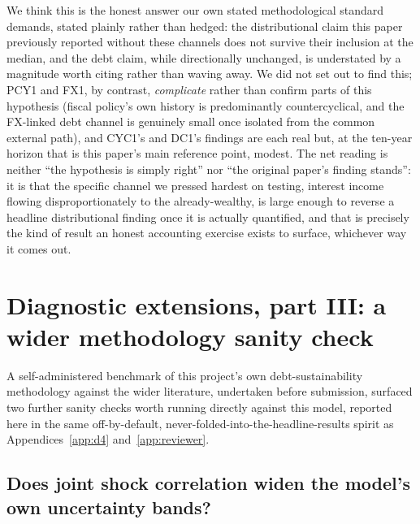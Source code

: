 \documentclass[11pt,a4paper]{article}
\begin{document}
We think this is the honest answer our own stated methodological standard demands, stated plainly rather than hedged: the distributional claim this paper previously reported without these channels does not survive their inclusion at the median, and the debt claim, while directionally unchanged, is understated by a magnitude worth citing rather than waving away. We did not set out to find this; PCY1 and FX1, by contrast, \emph{complicate} rather than confirm parts of this hypothesis (fiscal policy's own history is predominantly countercyclical, and the FX-linked debt channel is genuinely small once isolated from the common external path), and CYC1's and DC1's findings are each real but, at the ten-year horizon that is this paper's main reference point, modest. The net reading is neither ``the hypothesis is simply right'' nor ``the original paper's finding stands'': it is that the specific channel we pressed hardest on testing, interest income flowing disproportionately to the already-wealthy, is large enough to reverse a headline distributional finding once it is actually quantified, and that is precisely the kind of result an honest accounting exercise exists to surface, whichever way it comes out.

\section{Diagnostic extensions, part III: a wider methodology sanity check}
\label{app:benchmark}

\noindent A self-administered benchmark of this project's own debt-sustainability methodology against the wider literature, undertaken before submission, surfaced two further sanity checks worth running directly against this model, reported here in the same off-by-default, never-folded-into-the-headline-results spirit as Appendices~\ref{app:d4} and~\ref{app:reviewer}.

\subsection{Does joint shock correlation widen the model's own uncertainty bands?}
\label{sec:cor1}
\end{document}
